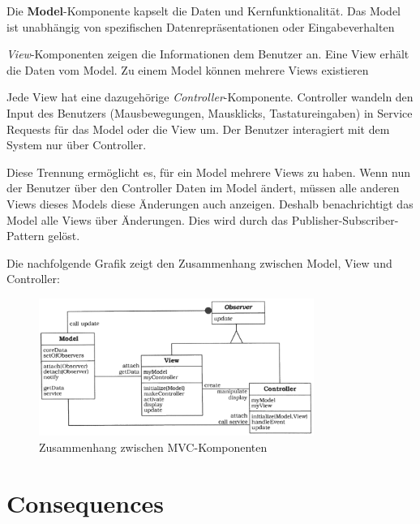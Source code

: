 Die \textbf{Model}-Komponente kapselt die Daten und Kernfunktionalität. Das Model ist unabhängig von spezifischen Datenrepräsentationen oder Eingabeverhalten

\textit{View}-Komponenten zeigen die Informationen dem Benutzer an. Eine View erhält die Daten vom Model. Zu einem Model können mehrere Views existieren

Jede View hat eine dazugehörige \textit{Controller}-Komponente. Controller wandeln den Input des Benutzers (Mausbewegungen, Mausklicks, Tastatureingaben) in Service Requests für das Model oder die View um. Der Benutzer interagiert mit dem System nur über Controller.

Diese Trennung ermöglicht es, für ein Model mehrere Views zu haben. Wenn nun der Benutzer über den Controller Daten im Model ändert, müssen alle anderen Views dieses Models diese Änderungen auch anzeigen. Deshalb benachrichtigt das Model alle Views über Änderungen. Dies wird durch das Publisher-Subscriber-Pattern gelöst.

Die nachfolgende Grafik zeigt den Zusammenhang zwischen Model, View und Controller:

\begin{figure}[H]
	\centering
	\includegraphics[width=0.8\textwidth]{figures/03-mvc-1}
	\caption{Zusammenhang zwischen MVC-Komponenten}
\end{figure}


\section{Consequences}
\begin{itemize}
\end{itemize}

